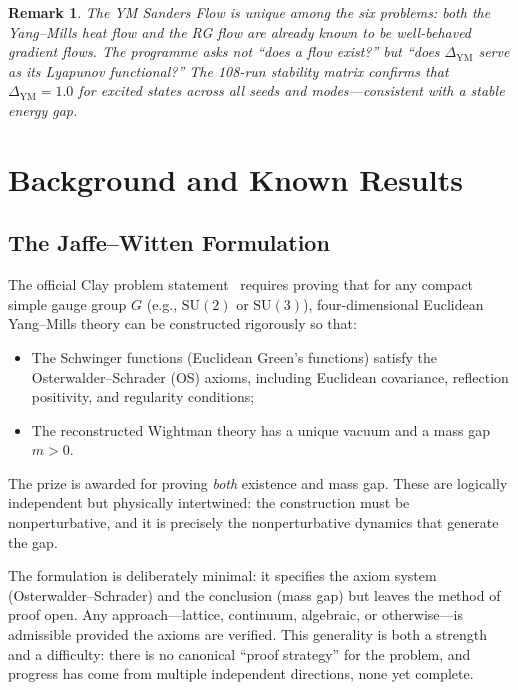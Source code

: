 \documentclass[11pt]{article}
\newtheorem{remark}[theorem]{Remark}
\begin{document}
\begin{remark}
The YM Sanders Flow is unique among the six problems: both the Yang--Mills heat flow
and the RG flow are \emph{already known} to be well-behaved gradient flows.  The
programme asks not ``does a flow exist?'' but ``does $\Delta_{\mathrm{YM}}$ serve as
its Lyapunov functional?''  The 108-run stability matrix confirms that
$\Delta_{\mathrm{YM}} = 1.0$ for excited states across all seeds and modes---consistent
with a stable energy gap.
\end{remark}

\section{Background and Known Results}
\label{sec:background}

\subsection{The Jaffe--Witten Formulation}

The official Clay problem statement~\cite{JW} requires proving that
for any compact simple gauge group $G$ (e.g., $\mathrm{SU}(2)$ or
$\mathrm{SU}(3)$), four-dimensional Euclidean Yang--Mills theory
can be constructed rigorously so that:
\begin{itemize}
  \item The Schwinger functions (Euclidean Green's functions) satisfy
    the Osterwalder--Schrader (OS) axioms, including Euclidean
    covariance, reflection positivity, and regularity conditions;
  \item The reconstructed Wightman theory has a unique vacuum and a
    mass gap $m > 0$.
\end{itemize}
The prize is awarded for proving \emph{both} existence and mass gap.
These are logically independent but physically intertwined: the
construction must be nonperturbative, and it is precisely the
nonperturbative dynamics that generate the gap.

The formulation is deliberately minimal: it specifies the axiom system
(Osterwalder--Schrader) and the conclusion (mass gap) but leaves the
method of proof open.  Any approach---lattice, continuum, algebraic,
or otherwise---is admissible provided the axioms are verified.  This
generality is both a strength and a difficulty: there is no canonical
``proof strategy'' for the problem, and progress has come from multiple
independent directions, none yet complete.
\end{document}
